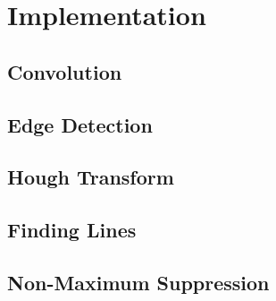 \section{Implementation}

\subsection{Convolution}

\subsection{Edge Detection}

\subsection{Hough Transform}

\subsection{Finding Lines}

\subsection{Non-Maximum Suppression}


